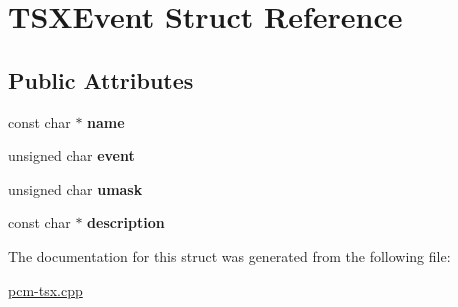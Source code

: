 \hypertarget{struct_t_s_x_event}{}\section{T\+S\+X\+Event Struct Reference}
\label{struct_t_s_x_event}
\subsection*{Public Attributes}
\begin{DoxyCompactItemize}
\item 
\mbox{\label{struct_t_s_x_event_a592441448f28d73655c864f5dbb77538}} 
const char $\ast$ {\bfseries name}
\item 
\mbox{\label{struct_t_s_x_event_a45969e694e699c485379594701bd7e35}} 
unsigned char {\bfseries event}
\item 
\mbox{\label{struct_t_s_x_event_a2f1b2f588a4641abde0dd5bd7870a537}} 
unsigned char {\bfseries umask}
\item 
\mbox{\label{struct_t_s_x_event_aae0d6de90f1596c51b6c0345356a1076}} 
const char $\ast$ {\bfseries description}
\end{DoxyCompactItemize}


The documentation for this struct was generated from the following file\+:\begin{DoxyCompactItemize}
\item 
\mbox{\hyperlink{pcm-tsx_8cpp}{pcm-\/tsx.\+cpp}}\end{DoxyCompactItemize}
